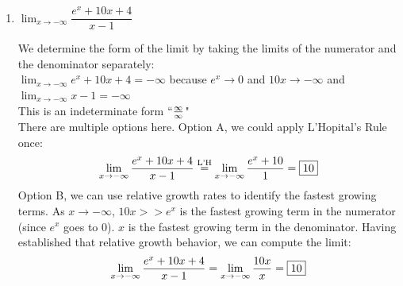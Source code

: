\documentclass{article}
\begin{document}
\begin{enumerate}
\begin{enumerate}
\begin{solution}
            \[\lim_{x \to \infty} \frac{x}{\arctan(x^2)} = \fbox{$\infty$}\]
            
            
        \end{solution}
        \item 
        \begin{problem}
        $\displaystyle\lim_{x\to -\infty}\dfrac{e^x+10x+4}{x-1}$
        \end{problem}
        \pspace{\vfill}

        \begin{solution}
            We determine the form of the limit by taking the limits of the numerator and the denominator separately: \\
            $\displaystyle \lim_{x\to-\infty} e^x + 10x + 4 =  - \infty$ because $e^x \to 0$ and $10x\to -\infty$ and 
            $\displaystyle \lim_{x\to-\infty} x-1 = -\infty$\\
            This is an indeterminate form $``\frac{\infty}{\infty}$" \\
            
            There are multiple options here. Option A, we could apply L'Hopital's Rule once:
            $$\lim_{x\to -\infty}\dfrac{e^x+10x+4}{x-1} \stackrel{\text{L'H}}{=} \lim_{x\to-\infty} \frac{e^x+10}{1} = \fbox{10}$$
            Option B, we can use relative growth rates to identify the fastest growing terms. As $x\to -\infty$, $10x>>e^x$ is the fastest growing term in the numerator (since $e^x$ goes to 0). $x$ is the fastest growing term in the denominator. Having established that relative growth behavior, we can compute the limit:
            $$\lim_{x\to -\infty}\dfrac{e^x+10x+4}{x-1}=\lim_{x\to-\infty}\frac{10x}{x} = \fbox{10}$$
        \end{solution}

        
    \end{enumerate}

\pspace{\newpage}

\end{enumerate}
\end{document}

